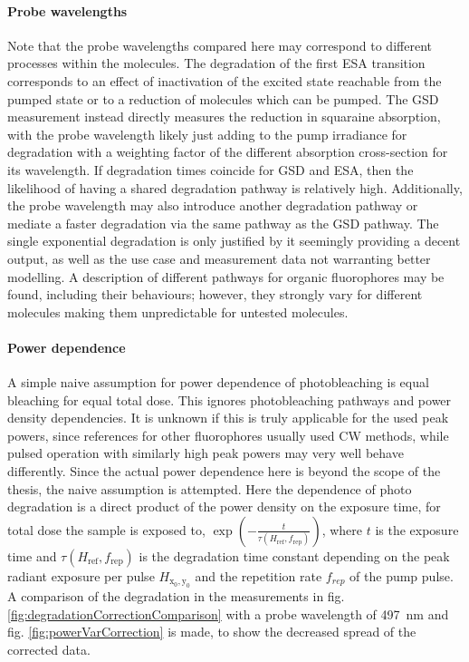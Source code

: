 \documentclass[twoside,openright,listof=numbered]{scrreprt}
\def\radiantExp{\ensuremath{H_\mathrm{x_0,y_0}}}
\begin{document}
\paragraph{Probe wavelengths}
Note that the probe wavelengths compared here may correspond to different processes within the molecules. The degradation of the first ESA transition corresponds to an effect of inactivation of the excited state reachable from the pumped state or to a reduction of molecules which can be pumped. The GSD measurement instead directly measures the reduction in squaraine absorption, with the probe wavelength likely just adding to the pump irradiance for degradation with a weighting factor of the different absorption cross-section for its wavelength. If degradation times coincide for GSD and ESA, then the likelihood of having a shared degradation pathway is relatively high. Additionally, the probe wavelength may also introduce another degradation pathway or mediate a faster degradation via the same pathway as the GSD pathway. The single exponential degradation is only justified by it seemingly providing a decent output, as well as the use case and measurement data not warranting better modelling. A description of different pathways for organic fluorophores may be found, including their behaviours; however, they strongly vary for different molecules making them unpredictable for untested molecules.\cite{Demchenko_2020}

\paragraph{Power dependence}
A simple naive assumption for power dependence of photobleaching is equal bleaching for equal total dose. This ignores photobleaching pathways and power density dependencies. It is unknown if this is truly applicable for the used peak powers, since references for other fluorophores usually used CW methods, while pulsed operation with similarly high peak powers may very well behave differently. Since the actual power dependence here is beyond the scope of the thesis, the naive assumption is attempted. Here the dependence of photo degradation is a direct product of the power density on the exposure time, for total dose the sample is exposed to, $\exp\left(-\frac{t}{\tau\left(H_\text{ref}, f_\text{rep}\right)}\right)$, where $t$ is the exposure time and $\tau\left(H_\text{ref}, f_\text{rep}\right)$ is the degradation time constant depending on the peak radiant exposure per pulse $\radiantExp$ and the repetition rate $f_{rep}$ of the pump pulse.\cite{Eggeling1998}
A comparison of the degradation in the measurements in fig. \ref{fig:degradationCorrectionComparison} with a probe wavelength of \SI{497}{\nano\meter} and fig. \ref{fig:powerVarCorrection} is made, to show the decreased spread of the corrected data.
\end{document}
